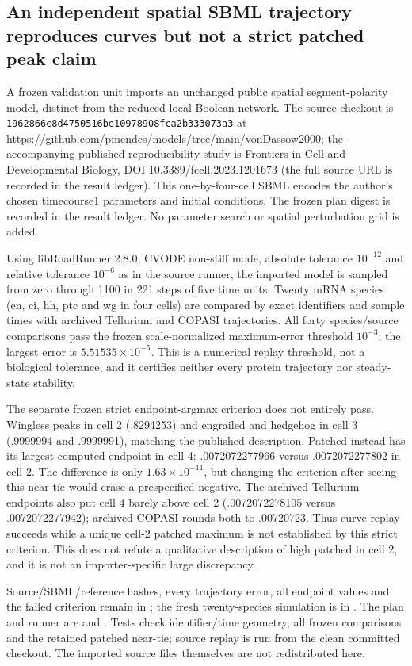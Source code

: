 \subsection{An independent spatial SBML trajectory reproduces curves but not a strict patched peak claim}
A frozen validation unit imports an unchanged public spatial segment-polarity model, distinct from the reduced local Boolean network. The source checkout is \texttt{1962866c8d4750516be10978908fca2b333073a3} at \url{https://github.com/pmendes/models/tree/main/vonDassow2000}; the accompanying published reproducibility study is Frontiers in Cell and Developmental Biology, DOI 10.3389/fcell.2023.1201673 (the full source URL is recorded in the result ledger). This one-by-four-cell SBML encodes the author's chosen timecourse1 parameters and initial conditions. The frozen plan digest is recorded in the result ledger. No parameter search or spatial perturbation grid is added.

Using libRoadRunner 2.8.0, CVODE non-stiff mode, absolute tolerance $10^{-12}$ and relative tolerance $10^{-6}$ as in the source runner, the imported model is sampled from zero through 1100 in 221 steps of five time units. Twenty mRNA species (en, ci, hh, ptc and wg in four cells) are compared by exact identifiers and sample times with archived Tellurium and COPASI trajectories. All forty species/source comparisons pass the frozen scale-normalized maximum-error threshold $10^{-3}$; the largest error is $5.51535\times10^{-5}$. This is a numerical replay threshold, not a biological tolerance, and it certifies neither every protein trajectory nor steady-state stability.

The separate frozen strict endpoint-argmax criterion does not entirely pass. Wingless peaks in cell 2 (.8294253) and engrailed and hedgehog in cell 3 (.9999994 and .9999991), matching the published description. Patched instead has its largest computed endpoint in cell 4: .0072072277966 versus .0072072277802 in cell 2. The difference is only $1.63\times10^{-11}$, but changing the criterion after seeing this near-tie would erase a prespecified negative. The archived Tellurium endpoints also put cell 4 barely above cell 2 (.0072072278105 versus .0072072277942); archived COPASI rounds both to .00720723. Thus curve replay succeeds while a unique cell-2 patched maximum is not established by this strict criterion. This does not refute a qualitative description of high patched in cell 2, and it is not an importer-specific large discrepancy.

Source/SBML/reference hashes, every trajectory error, all endpoint values and the failed criterion remain in ; the fresh twenty-species simulation is in . The plan and runner are  and . Tests check identifier/time geometry, all frozen comparisons and the retained patched near-tie; source replay is run from the clean committed checkout. The imported source files themselves are not redistributed here.

